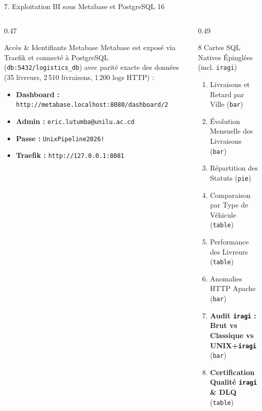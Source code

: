 \documentclass[aspectratio=169,10pt]{beamer}
\begin{document}
\begin{frame}{7. Exploitation BI sous Metabase et PostgreSQL 16}
    \begin{columns}[T]
        \begin{column}{0.47\textwidth}
            \begin{block}{Acc\`es \& Identifiants Metabase}
                \scriptsize\justifying
                Metabase est expos\'e via Traefik et connect\'e \`a PostgreSQL (\texttt{db:5432/logistics\_db}) avec parit\'e exacte des donn\'ees (35 livreurs, 2\,510 livraisons, 1\,200 logs HTTP) :
                \begin{itemize}
                    \item \textbf{Dashboard :} \texttt{http://metabase.localhost:8080/dashboard/2}
                    \item \textbf{Admin :} \texttt{eric.lutumba@unilu.ac.cd}
                    \item \textbf{Passe :} \texttt{UnixPipeline2026!}
                    \item \textbf{Traefik :} \texttt{http://127.0.0.1:8081}
                \end{itemize}
            \end{block}
        \end{column}
        \begin{column}{0.49\textwidth}
            \begin{exampleblock}{8 Cartes SQL Natives \'Epingl\'ees (incl. \texttt{iragi})}
                \scriptsize\justifying
                \begin{enumerate}
                    \item Livraisons et Retard par Ville (\texttt{bar})
                    \item \'Evolution Mensuelle des Livraisons (\texttt{bar})
                    \item R\'epartition des Statuts (\texttt{pie})
                    \item Comparaison par Type de V\'ehicule (\texttt{table})
                    \item Performance des Livreurs (\texttt{table})
                    \item Anomalies HTTP Apache (\texttt{bar})
                    \item \textbf{Audit \texttt{iragi} : Brut vs Classique vs UNIX+\texttt{iragi}} (\texttt{bar})
                    \item \textbf{Certification Qualit\'e \texttt{iragi} \& DLQ} (\texttt{table})
                \end{enumerate}
            \end{exampleblock}
        \end{column}
    \end{columns}
\end{frame}
\end{document}
